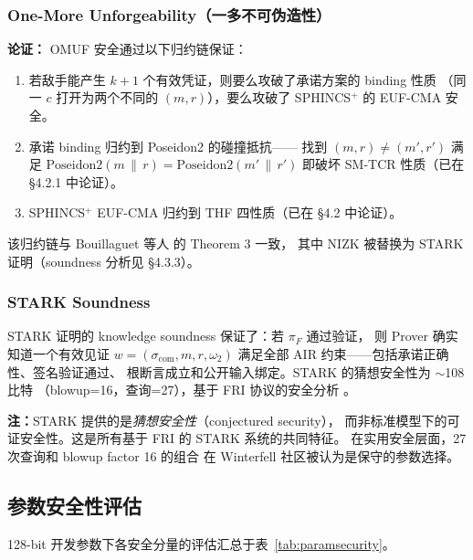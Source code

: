 \documentclass[11pt,a4paper]{ctexart}
\begin{document}
\subsubsection{One-More Unforgeability（一多不可伪造性）}

\textbf{论证：}
OMUF 安全通过以下归约链保证：
\begin{enumerate}[leftmargin=*]
\item 若敌手能产生 $k+1$ 个有效凭证，则要么攻破了承诺方案的 binding 性质
（同一 $c$ 打开为两个不同的 $(m, r)$），要么攻破了 SPHINCS$^+$ 的 EUF-CMA 安全。
\item 承诺 binding 归约到 Poseidon2 的碰撞抵抗——
找到 $(m, r) \neq (m', r')$ 满足 $\mathrm{Poseidon2}(m \,\|\, r) = \mathrm{Poseidon2}(m' \,\|\, r')$
即破坏 SM-TCR 性质（已在 §4.2.1 中论证）。
\item SPHINCS$^+$ EUF-CMA 归约到 THF 四性质（已在 §4.2 中论证）。
\end{enumerate}
该归约链与 Bouillaguet 等人 \cite{Bouillaguet2026BlindingPH} 的 Theorem 3 一致，
其中 NIZK 被替换为 STARK 证明（soundness 分析见 §4.3.3）。

\subsubsection{STARK Soundness}

STARK 证明的 knowledge soundness 保证了：若 $\pi_F$ 通过验证，
则 Prover 确实知道一个有效见证 $w = (\sigma_{\mathrm{com}}, m, r, \omega_2)$
满足全部 AIR 约束——包括承诺正确性、签名验证通过、
根断言成立和公开输入绑定。STARK 的猜想安全性为 $\sim$108 比特
（blowup=16，查询=27），基于 FRI 协议的安全分析 \cite{2019DEEP}。

\textbf{注：}STARK 提供的是\emph{猜想安全性}（conjectured security），
而非标准模型下的可证安全性。这是所有基于 FRI 的 STARK 系统的共同特征。
在实用安全层面，27 次查询和 blowup factor 16 的组合
在 Winterfell 社区被认为是保守的参数选择。

\subsection{参数安全性评估}

128-bit 开发参数下各安全分量的评估汇总于表~\ref{tab:paramsecurity}。
\end{document}
